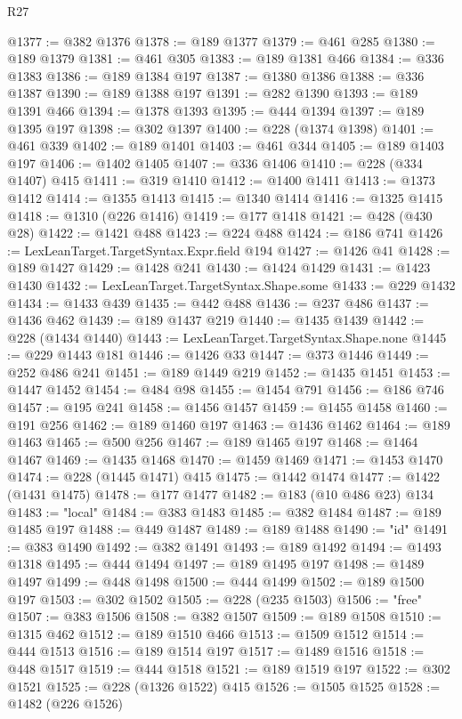 \begin{lexlean}{R27}
\begin{coremodule}
@1377 := @382 @1376
@1378 := @189 @1377
@1379 := @461 @285
@1380 := @189 @1379
@1381 := @461 @305
@1383 := @189 @1381 @466
@1384 := @336 @1383
@1386 := @189 @1384 @197
@1387 := @1380 @1386
@1388 := @336 @1387
@1390 := @189 @1388 @197
@1391 := @282 @1390
@1393 := @189 @1391 @466
@1394 := @1378 @1393
@1395 := @444 @1394
@1397 := @189 @1395 @197
@1398 := @302 @1397
@1400 := @228 (@1374 @1398)
@1401 := @461 @339
@1402 := @189 @1401
@1403 := @461 @344
@1405 := @189 @1403 @197
@1406 := @1402 @1405
@1407 := @336 @1406
@1410 := @228 (@334 @1407) @415
@1411 := @319 @1410
@1412 := @1400 @1411
@1413 := @1373 @1412
@1414 := @1355 @1413
@1415 := @1340 @1414
@1416 := @1325 @1415
@1418 := @1310 (@226 @1416)
@1419 := @177 @1418
@1421 := @428 (@430 @28)
@1422 := @1421 @488
@1423 := @224 @488
@1424 := @186 @741
@1426 := LexLeanTarget.TargetSyntax.Expr.field @194
@1427 := @1426 @41
@1428 := @189 @1427
@1429 := @1428 @241
@1430 := @1424 @1429
@1431 := @1423 @1430
@1432 := LexLeanTarget.TargetSyntax.Shape.some
@1433 := @229 @1432
@1434 := @1433 @439
@1435 := @442 @488
@1436 := @237 @486
@1437 := @1436 @462
@1439 := @189 @1437 @219
@1440 := @1435 @1439
@1442 := @228 (@1434 @1440)
@1443 := LexLeanTarget.TargetSyntax.Shape.none
@1445 := @229 @1443 @181
@1446 := @1426 @33
@1447 := @373 @1446
@1449 := @252 @486 @241
@1451 := @189 @1449 @219
@1452 := @1435 @1451
@1453 := @1447 @1452
@1454 := @484 @98
@1455 := @1454 @791
@1456 := @186 @746
@1457 := @195 @241
@1458 := @1456 @1457
@1459 := @1455 @1458
@1460 := @191 @256
@1462 := @189 @1460 @197
@1463 := @1436 @1462
@1464 := @189 @1463
@1465 := @500 @256
@1467 := @189 @1465 @197
@1468 := @1464 @1467
@1469 := @1435 @1468
@1470 := @1459 @1469
@1471 := @1453 @1470
@1474 := @228 (@1445 @1471) @415
@1475 := @1442 @1474
@1477 := @1422 (@1431 @1475)
@1478 := @177 @1477
@1482 := @183 (@10 @486 @23) @134
@1483 := "local"
@1484 := @383 @1483
@1485 := @382 @1484
@1487 := @189 @1485 @197
@1488 := @449 @1487
@1489 := @189 @1488
@1490 := "id"
@1491 := @383 @1490
@1492 := @382 @1491
@1493 := @189 @1492
@1494 := @1493 @1318
@1495 := @444 @1494
@1497 := @189 @1495 @197
@1498 := @1489 @1497
@1499 := @448 @1498
@1500 := @444 @1499
@1502 := @189 @1500 @197
@1503 := @302 @1502
@1505 := @228 (@235 @1503)
@1506 := "free"
@1507 := @383 @1506
@1508 := @382 @1507
@1509 := @189 @1508
@1510 := @1315 @462
@1512 := @189 @1510 @466
@1513 := @1509 @1512
@1514 := @444 @1513
@1516 := @189 @1514 @197
@1517 := @1489 @1516
@1518 := @448 @1517
@1519 := @444 @1518
@1521 := @189 @1519 @197
@1522 := @302 @1521
@1525 := @228 (@1326 @1522) @415
@1526 := @1505 @1525
@1528 := @1482 (@226 @1526)

\end{coremodule}
\end{lexlean}
